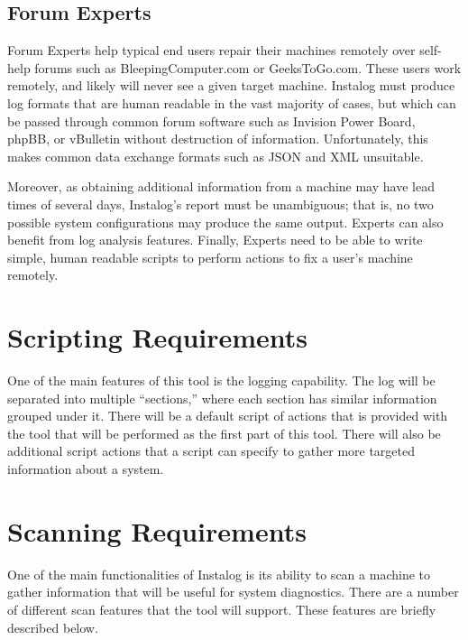 \documentclass[letterpaper,12pt]{article}
\begin{document}
\subsection{Forum Experts}
Forum Experts help typical end users repair their machines remotely over
self-help forums such as BleepingComputer.com or GeeksToGo.com.
These users work remotely, and likely will never see a given target
machine.
Instalog must produce log formats that are human readable in the vast majority
of cases, but which can be passed through common forum software such as Invision
Power Board, phpBB, or vBulletin without destruction of information.
Unfortunately, this makes common data exchange formats such as JSON and XML
unsuitable. 

Moreover, as obtaining additional information from a machine may
have lead times of several days, Instalog's report must be unambiguous; that is,
no two possible system configurations may produce the same output. Experts can
also benefit from log analysis features. Finally, Experts need to be able to
write simple, human readable scripts to perform actions to fix a user's machine
remotely.

\newpage



\section{Scripting Requirements} \label{scripting}
One of the main features of this tool is the logging capability.  The log will
be separated into multiple ``sections,'' where each section has similar
information grouped under it.  There will be a default script of actions that is
provided with the tool that will be performed as the first part of this tool.   
There will also be additional script actions that a script can specify to gather
more targeted information about a system.

\newpage



\section{Scanning Requirements}
One of the main functionalities of Instalog is its ability to scan a machine to
gather information that will be useful for system diagnostics.  There are a
number of different scan features that the tool will support.  These features
are briefly described below.
\end{document}
